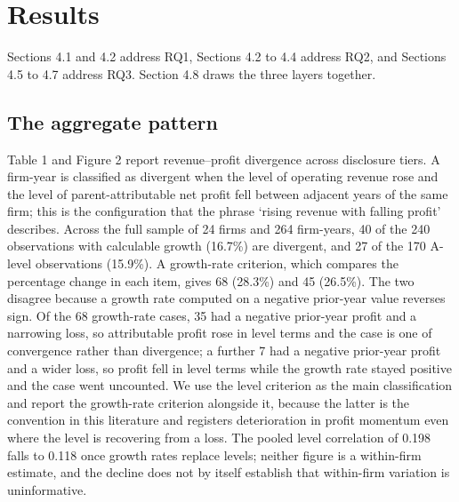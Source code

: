 \documentclass[review,3p,times]{elsarticle}
\begin{document}
\section{Results}

Sections 4.1 and 4.2 address RQ1, Sections 4.2 to 4.4 address RQ2, and Sections 4.5 to 4.7 address RQ3. Section 4.8 draws the three layers together.

\subsection{The aggregate pattern}

Table 1 and Figure 2 report revenue--profit divergence across disclosure tiers. A firm-year is classified as divergent when the level of operating revenue rose and the level of parent-attributable net profit fell between adjacent years of the same firm; this is the configuration that the phrase `rising revenue with falling profit' describes. Across the full sample of 24 firms and 264 firm-years, 40 of the 240 observations with calculable growth (16.7\%) are divergent, and 27 of the 170 A-level observations (15.9\%). A growth-rate criterion, which compares the percentage change in each item, gives 68 (28.3\%) and 45 (26.5\%). The two disagree because a growth rate computed on a negative prior-year value reverses sign. Of the 68 growth-rate cases, 35 had a negative prior-year profit and a narrowing loss, so attributable profit rose in level terms and the case is one of convergence rather than divergence; a further 7 had a negative prior-year profit and a wider loss, so profit fell in level terms while the growth rate stayed positive and the case went uncounted. We use the level criterion as the main classification and report the growth-rate criterion alongside it, because the latter is the convention in this literature and registers deterioration in profit momentum even where the level is recovering from a loss. The pooled level correlation of 0.198 falls to 0.118 once growth rates replace levels; neither figure is a within-firm estimate, and the decline does not by itself establish that within-firm variation is uninformative.
\end{document}

